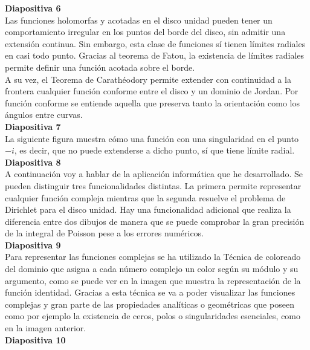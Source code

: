\documentclass[spanish, a4paper, 12pt]{article}
\begin{document}
\textbf{Diapositiva 6} \\

Las funciones holomorfas y acotadas en el disco unidad pueden tener un comportamiento irregular en los puntos del borde del disco, sin admitir una extensión continua. Sin embargo, esta clase de funciones sí tienen límites radiales en casi todo punto. Gracias al teorema de Fatou, la existencia de límites radiales permite definir una función acotada sobre el borde. \\

A su vez, el Teorema de Carathéodory permite extender con continuidad a la frontera cualquier función conforme entre el disco y un dominio de Jordan. Por función conforme se entiende aquella que preserva tanto la orientación como los ángulos entre curvas.\\

\textbf{Diapositiva 7} \\

La siguiente figura muestra cómo una función con una singularidad en el punto $-i$, es decir, que no puede extenderse a dicho punto, sí que tiene límite radial. \\

\textbf{Diapositiva 8} \\

A continuación voy a hablar de la aplicación informática que he desarrollado. Se pueden distinguir tres funcionalidades distintas. La primera permite representar cualquier función compleja mientras que la segunda resuelve el problema de Dirichlet para el disco unidad. Hay una funcionalidad adicional que realiza la diferencia entre dos dibujos de manera que se puede comprobar la gran precisión de la integral de Poisson pese a los errores numéricos. \\

\textbf{Diapositiva 9} \\

Para representar las funciones complejas se ha utilizado la Técnica de coloreado del dominio que asigna a cada número complejo un color según su módulo y su argumento, como se puede ver en la imagen que muestra la representación de la función identidad. Gracias a esta técnica se va a poder visualizar las funciones complejas y gran parte de las propiedades analíticas o geométricas que poseen como por ejemplo la existencia de ceros, polos o singularidades esenciales, como en la imagen anterior. \\

\textbf{Diapositiva 10} \\
\end{document}

